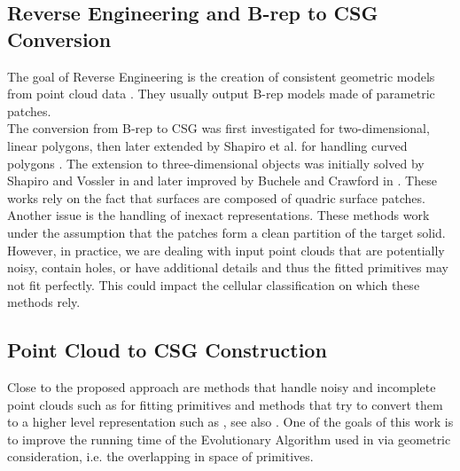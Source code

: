 \subsection{Reverse Engineering and B-rep to CSG Conversion}
The goal of Reverse Engineering is the creation of consistent geometric models from point cloud data \cite{VMC97,BMV01}. 
They usually output B-rep models made of parametric patches.
\\
The conversion from B-rep to CSG was first investigated 
for two-dimensional, linear polygons, then 
later extended by Shapiro et al. for handling curved polygons \cite{shapiro1991efficient, shapiro2001convex}. 
The extension to three-dimensional objects was initially solved 
by Shapiro and Vossler in 
\cite{shapiro1991construction, shapiro1993separation} 
and later improved by 
Buchele and Crawford in \cite{buchele2004three}. 
These works rely on the fact that surfaces are composed of quadric surface patches. 
Another issue is the handling of inexact representations. 
These methods work under the assumption that the patches form a clean partition of the 
target solid. However, in practice, we are dealing with input point clouds that are potentially 
noisy, contain holes, or have additional details and thus the fitted primitives may not fit perfectly. 
This could impact the cellular classification on which these methods rely. 

\subsection{Point Cloud to CSG Construction}
\label{sec:pipeline}
Close to the proposed approach are methods that handle noisy and incomplete point clouds 
such as \cite{schnabel2007efficient} for fitting primitives and methods that try to convert them to a higher level representation such as \cite{fayolle2016evolutionary}, see also \cite[Sections~7 and 8]{berger2017survey}. 
One of the goals of this work is to improve the running time of the Evolutionary Algorithm used in \cite{fayolle2016evolutionary} via geometric consideration, i.e. the overlapping in space of primitives.

